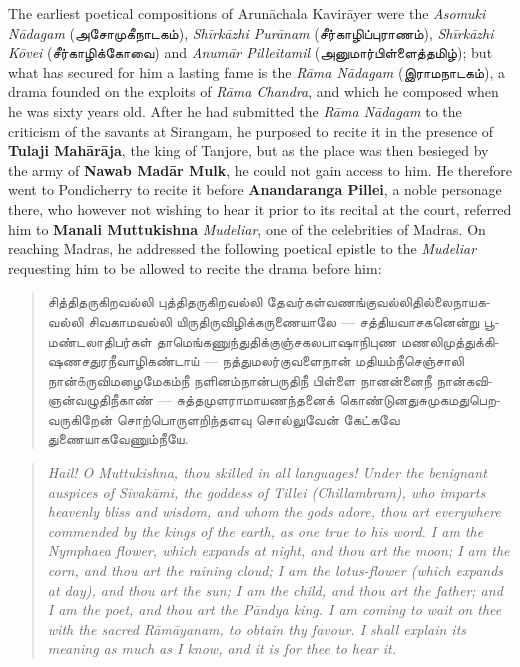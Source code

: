 \documentclass{article}
\newcommand{\TamilText}[1]{\texttamil{#1}}
\newcommand{\tam}[1]{\TamilText{#1}}
\begin{document}
The earliest poetical compositions of Arun\={a}chala Kavir\={a}yer were the \emph{Asomuki N\={a}dagam} (\tam{அசோமுகீநாடகம்}), \emph{Sh\={i}rk\={a}zhi Pur\={a}nam} (\tam{சீர்காழிப்புராணம்}), \emph{Sh\={i}rk\={a}zhi K\={o}vei} (\tam{சீர்காழிக்கோவை}) and \emph{Anum\={a}r Pilleitamil} (\tam{அனுமார்பிள்ளைத்தமிழ்}); but what has secured for him a lasting fame is the \emph{R\={a}ma N\={a}dagam} (\tam{இராமநாடகம்}), a drama founded on the exploits of \emph{R\={a}ma Chandra}, and which he composed when he was sixty years old. After he had submitted the \emph{R\={a}ma N\={a}dagam} to the criticism of the savants at Sirangam, he purposed to recite it in the presence of \textbf{Tulaji Mah\={a}r\={a}ja}, the king of Tanjore, but as the place was then besieged by the army of \textbf{Nawab Mad\={a}r Mulk}, he could not gain access to him. He therefore went to Pondicherry to recite it before \textbf{Anandaranga Pillei}, a noble personage there, who however not wishing to hear it prior to its recital at the court, referred him to \textbf{Manali Muttukishna} \emph{Mudeliar}, one of the celebrities of Madras. On reaching Madras, he addressed the following poetical epistle to the \emph{Mudeliar} requesting him to be allowed to recite the drama before him:
\begin{quotation}\small
\tam{சித்திதருகிறவல்லி புத்திதருகிறவல்லி தேவர்கள்‌வணங்குவல்லிதில்லைநாயகவல்லி சிவகாமவல்லி யிருதிருவிழிக்கருணையாலே} --- \tam{சத்தியவாசகனென்று பூமண்டலாதிபர்கள்‌ தாமெங்கணுந்துதிக்குஞ்‌சகலபாஷாநிபுண மணலிமுத்துக்கிஷணசதுரநீவாழிகண்டாய்‌} --- \tam{நத்துமலர்குவளைநான்‌ மதியம்நீசெஞ்சாலி நான்௧ருவிமழைமேகம்நீ நளினம்நான்பருதிநீ பிள்ளை நானன்னைநீ நான்கவிஞன்வழுதிநீகாண்‌} --- \tam{சுத்தமுளராமாயணந்தனைக் கொண்டுனதுசுமுகமதுபெறவருகிறேன்‌ சொற்பொருளறிந்தளவு சொல்லுவேன்‌ கேட்கவே துணையாகவேணும்நீயே}.
\end{quotation}
\begin{quotation}\small
\emph{Hail! O Muttukishna, thou skilled in all languages! Under the benignant auspices of S\={i}vak\={a}mi, the goddess of Tillei (Chillambram), who imparts heavenly bliss and wisdom, and whom the gods adore, thou art everywhere commended by the kings of the earth, as one true to his word. I am the Nymphaea flower, which expands at night, and thou art the moon; I am the corn, and thou art the raining cloud; I am the lotus-flower (which expands at day), and thou art the sun; I am the child, and thou art the father; and I am the poet, and thou art the P\={a}ndya king. I am coming to wait on thee with the sacred R\={a}m\={a}yanam, to obtain thy favour. I shall explain its meaning as much as I know, and it is for thee to hear it.}
\end{quotation}
\end{document}
